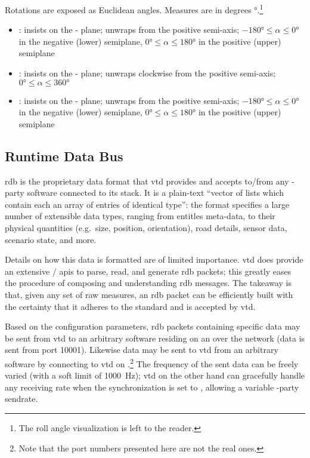 Rotations are exposed as Euclidean angles. Measures are in degrees \si{\degree}.\footnote{The roll angle visualization is left to the reader.}

\begin{itemize}
	\item {}: insists on the - plane; unwraps from the positive  semi-axis; $\ang{-180} \leqslant \alpha \leqslant \ang{0}$ in the negative (lower) semiplane, $\ang{0} \leqslant \alpha \leqslant \ang{180}$ in the positive (upper) semiplane
	\item {}: insists on the - plane; unwraps clockwise from the positive  semi-axis; $\ang{0} \leqslant \alpha \leqslant \ang{360}$
	\item {}: insists on the - plane; unwraps from the positive  semi-axis; $\ang{-180} \leqslant \alpha \leqslant \ang{0}$ in the negative (lower) semiplane, $\ang{0} \leqslant \alpha \leqslant \ang{180}$ in the positive (upper) semiplane
\end{itemize}

\subsection{Runtime Data Bus}

\gls{rdb} is the proprietary data format that \gls{vtd} provides and accepts to/from any -party software connected to its stack. It is a plain-text \enquote{vector of lists which contain each an array of entries of identical type}{\cite{software:rdbfaqs}}: the format specifies a large number of extensible data types, ranging from entitles meta-data, to their physical quantities (e.g.\ size, position, orientation), road details, sensor data, scenario state, and more.

Details on how this data is formatted are of limited importance. \gls{vtd} does provide an extensive / \glspl{api} to parse, read, and generate \gls{rdb} packets; this greatly eases the procedure of composing and understanding \gls{rdb} messages. The takeaway is that, given any set of raw measures, an \gls{rdb} packet can be efficiently built with the certainty that it adheres to the standard and is accepted by \gls{vtd}.

Based on the configuration parameters, \gls{rdb} packets containing specific data may be sent from \gls{vtd} to an arbitrary software residing on an  over the network (data is sent from port \num{10001}). Likewise data may be sent to \gls{vtd} from an arbitrary software by connecting to \gls{vtd} on .\footnote{Note that the port numbers presented here are not the real ones.} The frequency of the sent data can be freely varied (with a soft limit of \SI{1000}{\hertz}); \gls{vtd} on the other hand can gracefully handle any receiving rate when the synchronization is set to , allowing a variable -party sendrate.

